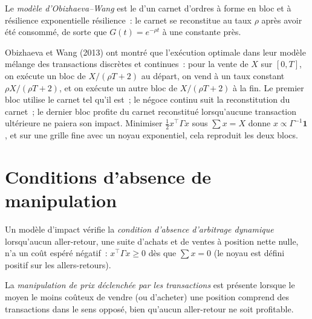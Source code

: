 \begin{definition}\label{def:mx:transient-impact-and-propagator-models:ow}
Le \emph{modèle d'Obizhaeva--Wang} est le  d'un carnet d'ordres à forme en bloc et à résilience exponentielle
résilience~: le carnet se reconstitue au taux $\rho$ après avoir été consommé, de sorte que $G(t)=e^{-\rho t}$ à une constante près.
\end{definition}

Obizhaeva et Wang (2013) ont montré que l'exécution optimale dans leur modèle mélange des transactions discrètes et continues~: pour la vente de $X$ sur $[0,T]$, on exécute un bloc
de $X/(\rho T+2)$ au départ, on vend à un taux constant $\rho X/(\rho T+2)$, et on exécute un autre bloc de $X/(\rho T+2)$ à la fin. Le premier bloc utilise le
carnet tel qu'il est~; le négoce continu suit la reconstitution du carnet~; le dernier bloc profite du carnet reconstitué lorsqu'aucune transaction ultérieure ne paiera son impact.
Minimiser $\tfrac12x^\top\Gamma x$ sous $\sum x=X$ donne $x\propto\Gamma^{-1}\mathbf 1$, et sur une grille fine avec un noyau exponentiel, cela reproduit les
deux blocs.

\section{Conditions d'absence de manipulation}

\begin{definition}\label{def:mx:transient-impact-and-propagator-models:nda}
Un modèle d'impact vérifie la \emph{condition d'absence d'arbitrage dynamique} lorsqu'aucun aller-retour, une suite d'achats et de ventes
à position nette nulle, n'a un coût espéré négatif~: $x^\top\Gamma x\ge0$ dès que $\sum x=0$ (le noyau est défini positif sur les allers-retours).
\end{definition}

\begin{definition}\label{def:mx:transient-impact-and-propagator-models:ttpm}
La \emph{manipulation de prix déclenchée par les transactions} est présente lorsque le moyen le moins coûteux de vendre (ou d'acheter) une
position comprend des transactions dans le sens opposé, bien qu'aucun aller-retour ne soit profitable.
\end{definition}

